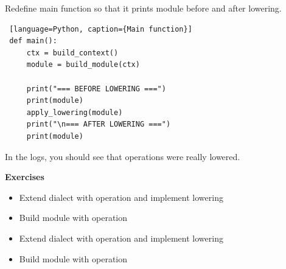 \documentclass[../main.tex]{subfiles}
\begin{document}
Redefine main function so that it prints module before and after lowering.
\begin{lstlisting} [language=Python, caption={Main function}]
 def main():
     ctx = build_context()
     module = build_module(ctx)

     print("=== BEFORE LOWERING ===")
     print(module)
     apply_lowering(module)
     print("\n=== AFTER LOWERING ===")
     print(module)
\end{lstlisting}
In the logs, you should see that operations were really lowered.


\textbf{Exercises}
\begin{itemize}
    \item Extend dialect with  operation and implement lowering
    \item Build module with  operation
    \item Extend dialect with  operation and implement lowering
    \item Build module with  operation
\end{itemize}
\end{document}
